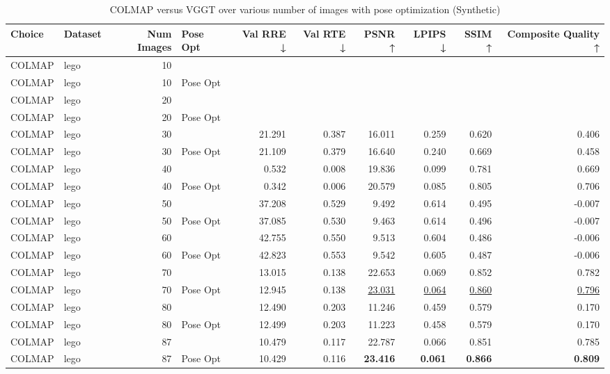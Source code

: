\begin{table}[H]
\caption{\ifdefined\customcaption \customcaption \else COLMAP versus VGGT over various number of images with pose optimization (Synthetic) \fi}
\label{tab:01_num_images_pose_opt_synthetic}
\centering
\scriptsize
\begin{tabular}{llrlrrrrrr}
\toprule
Choice & Dataset & Num Images & Pose Opt & Val RRE ↓ & Val RTE ↓ & PSNR ↑ & LPIPS ↓ & SSIM ↑ & Composite Quality ↑ \\
\midrule
COLMAP & lego & 10 &  &  &  &  &  &  &  \\
COLMAP & lego & 10 & Pose Opt &  &  &  &  &  &  \\
COLMAP & lego & 20 &  &  &  &  &  &  &  \\
COLMAP & lego & 20 & Pose Opt &  &  &  &  &  &  \\
COLMAP & lego & 30 &  & 21.291 & 0.387 & 16.011 & 0.259 & 0.620 & 0.406 \\
COLMAP & lego & 30 & Pose Opt & 21.109 & 0.379 & 16.640 & 0.240 & 0.669 & 0.458 \\
COLMAP & lego & 40 &  & 0.532 & 0.008 & 19.836 & 0.099 & 0.781 & 0.669 \\
COLMAP & lego & 40 & Pose Opt & 0.342 & 0.006 & 20.579 & 0.085 & 0.805 & 0.706 \\
COLMAP & lego & 50 &  & 37.208 & 0.529 & 9.492 & 0.614 & 0.495 & -0.007 \\
COLMAP & lego & 50 & Pose Opt & 37.085 & 0.530 & 9.463 & 0.614 & 0.496 & -0.007 \\
COLMAP & lego & 60 &  & 42.755 & 0.550 & 9.513 & 0.604 & 0.486 & -0.006 \\
COLMAP & lego & 60 & Pose Opt & 42.823 & 0.553 & 9.542 & 0.605 & 0.487 & -0.006 \\
COLMAP & lego & 70 &  & 13.015 & 0.138 & 22.653 & 0.069 & 0.852 & 0.782 \\
COLMAP & lego & 70 & Pose Opt & 12.945 & 0.138 & \underline{23.031} & \underline{0.064} & \underline{0.860} & \underline{0.796} \\
COLMAP & lego & 80 &  & 12.490 & 0.203 & 11.246 & 0.459 & 0.579 & 0.170 \\
COLMAP & lego & 80 & Pose Opt & 12.499 & 0.203 & 11.223 & 0.458 & 0.579 & 0.170 \\
COLMAP & lego & 87 &  & 10.479 & 0.117 & 22.787 & 0.066 & 0.851 & 0.785 \\
COLMAP & lego & 87 & Pose Opt & 10.429 & 0.116 & \textbf{23.416} & \textbf{0.061} & \textbf{0.866} & \textbf{0.809} \\

\end{tabular}
\end{table}
